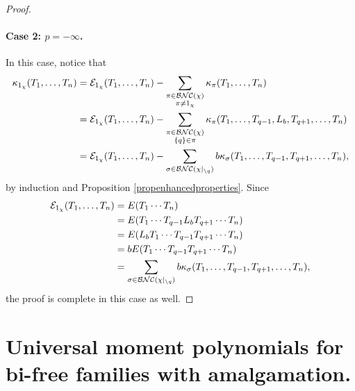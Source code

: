 \begin{proof}
			\paragraph{Case 2: $p = -\infty$.}
			In this case, notice that
			\begin{align*}
				\kappa_{1_\chi}(T_1, \ldots, T_n)
				&= \mathcal{E}_{1_\chi}(T_1, \ldots, T_n) - \sum_{\substack{\pi \in \mathcal{BNC}(\chi)\\ \pi \neq 1_\chi}}\kappa_{\pi}(T_1, \ldots, T_n)
				\\
				&= \mathcal{E}_{1_\chi}(T_1, \ldots, T_n) - \sum_{\substack{\pi \in \mathcal{BNC}(\chi)\\ \left\{q\right\} \in \pi}}\kappa_{\pi}(T_1, \ldots, T_{q-1}, L_b, T_{q+1}, \ldots, T_n)
				\\
				&= \mathcal{E}_{1_\chi}(T_1, \ldots, T_n) - \sum_{\sigma \in \mathcal{BNC}(\chi|_{\setminus q})} b\kappa_{\sigma}(T_1, \ldots, T_{q-1}, T_{q+1}, \ldots, T_n),
			\end{align*}
			by induction and Proposition \ref{propenhancedproperties}.
			Since
			\begin{align*}
				\mathcal{E}_{1_\chi}(T_1, \ldots, T_n) &= E(T_1\cdots T_n)
				\\
				&= E(T_1 \cdots T_{q-1} L_b T_{q+1} \cdots T_n) \\
				&=
				E(L_bT_1 \cdots T_{q-1} T_{q+1}\cdots T_n) \\
				&=
				bE(T_1 \cdots T_{q-1} T_{q+1}\cdots T_n) \\
				&=
				\sum_{\sigma \in \mathcal{BNC}(\chi|_{\setminus q})} b\kappa_{\sigma}(T_1, \ldots, T_{q-1}, T_{q+1}, \ldots, T_n),
			\end{align*}
			the proof is complete in this case as well.
		\end{proof}














		\section{Universal moment polynomials for bi-free families with amalgamation.}
		\label{sec:universalmomentpolysforbifreewithamalgamation}

